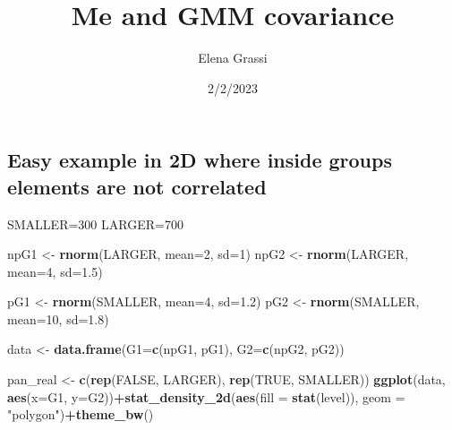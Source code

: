 \documentclass[]{article}
\title{Me and GMM covariance}
\author{Elena Grassi}
\date{2/2/2023}
\newenvironment{Shaded}{\begin{snugshade}}{\end{snugshade}}
\newcommand{\DataTypeTok}[1]{\textcolor[rgb]{0.13,0.29,0.53}{#1}}
\newcommand{\DecValTok}[1]{\textcolor[rgb]{0.00,0.00,0.81}{#1}}
\newcommand{\FloatTok}[1]{\textcolor[rgb]{0.00,0.00,0.81}{#1}}
\newcommand{\KeywordTok}[1]{\textcolor[rgb]{0.13,0.29,0.53}{\textbf{#1}}}
\newcommand{\NormalTok}[1]{#1}
\newcommand{\OperatorTok}[1]{\textcolor[rgb]{0.81,0.36,0.00}{\textbf{#1}}}
\newcommand{\OtherTok}[1]{\textcolor[rgb]{0.56,0.35,0.01}{#1}}
\newcommand{\StringTok}[1]{\textcolor[rgb]{0.31,0.60,0.02}{#1}}
\begin{document}
\maketitle

\hypertarget{easy-example-in-2d-where-inside-groups-elements-are-not-correlated}{%
\subsection{Easy example in 2D where inside groups elements are not
correlated}\label{easy-example-in-2d-where-inside-groups-elements-are-not-correlated}}

\begin{Shaded}
\begin{Highlighting}[]
\NormalTok{SMALLER=}\DecValTok{300}
\NormalTok{LARGER=}\DecValTok{700}

\NormalTok{npG1 <-}\StringTok{ }\KeywordTok{rnorm}\NormalTok{(LARGER, }\DataTypeTok{mean=}\DecValTok{2}\NormalTok{, }\DataTypeTok{sd=}\DecValTok{1}\NormalTok{)}
\NormalTok{npG2 <-}\StringTok{ }\KeywordTok{rnorm}\NormalTok{(LARGER, }\DataTypeTok{mean=}\DecValTok{4}\NormalTok{, }\DataTypeTok{sd=}\FloatTok{1.5}\NormalTok{)}

\NormalTok{pG1 <-}\StringTok{ }\KeywordTok{rnorm}\NormalTok{(SMALLER, }\DataTypeTok{mean=}\DecValTok{4}\NormalTok{, }\DataTypeTok{sd=}\FloatTok{1.2}\NormalTok{)}
\NormalTok{pG2 <-}\StringTok{ }\KeywordTok{rnorm}\NormalTok{(SMALLER, }\DataTypeTok{mean=}\DecValTok{10}\NormalTok{, }\DataTypeTok{sd=}\FloatTok{1.8}\NormalTok{)}

\NormalTok{data <-}\StringTok{ }\KeywordTok{data.frame}\NormalTok{(}\DataTypeTok{G1=}\KeywordTok{c}\NormalTok{(npG1, pG1), }\DataTypeTok{G2=}\KeywordTok{c}\NormalTok{(npG2, pG2))}

\NormalTok{pan_real <-}\StringTok{ }\KeywordTok{c}\NormalTok{(}\KeywordTok{rep}\NormalTok{(}\OtherTok{FALSE}\NormalTok{, LARGER), }\KeywordTok{rep}\NormalTok{(}\OtherTok{TRUE}\NormalTok{, SMALLER))}
\KeywordTok{ggplot}\NormalTok{(data, }\KeywordTok{aes}\NormalTok{(}\DataTypeTok{x=}\NormalTok{G1, }\DataTypeTok{y=}\NormalTok{G2))}\OperatorTok{+}\KeywordTok{stat_density_2d}\NormalTok{(}\KeywordTok{aes}\NormalTok{(}\DataTypeTok{fill =} \KeywordTok{stat}\NormalTok{(level)), }\DataTypeTok{geom =} \StringTok{"polygon"}\NormalTok{)}\OperatorTok{+}\KeywordTok{theme_bw}\NormalTok{()}
\end{Highlighting}
\end{Shaded}
\end{document}
